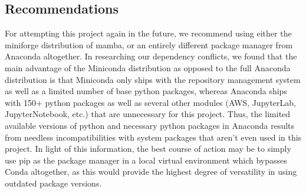 \subsection{Recommendations} 
For attempting this project again in the future, we recommend using either the miniforge distribution of mamba, or an entirely different package manager from Anaconda altogether. In researching our dependency conflicts, we found that the main advantage of the  Miniconda distribution as opposed to the full Anaconda distribution is that Miniconda only ships with the repository management system as well as a limited number of base python packages, whereas Anaconda ships with 150+ python packages as well as several other modules (AWS, JupyterLab, JupyterNotebook, etc.) that are unnecessary for this project. Thus, the limited available versions of python and necessary python packages in Anaconda results from needless incompatibilities with system packages that aren't even used in this project. In light of this information, the best course of action may be to simply use pip as the package manager in a local virtual environment which bypasses Conda altogether, as this would provide the highest degree of versatility in using outdated package versions.



